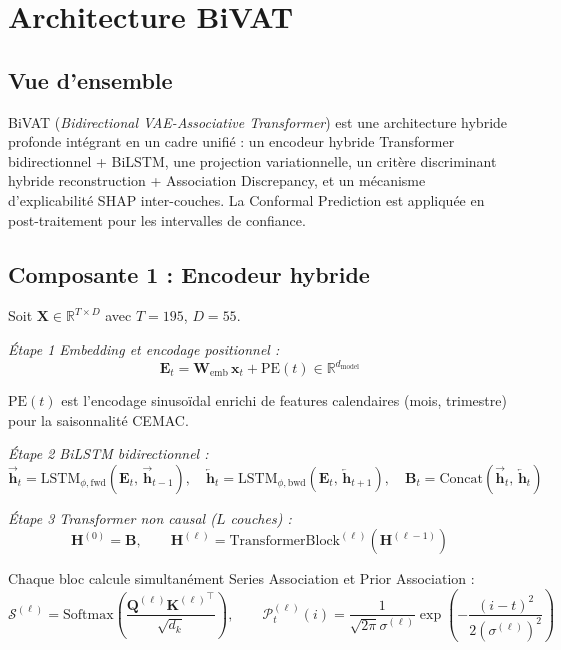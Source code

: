 \documentclass[12pt,a4paper]{article}
\begin{document}
\section{Architecture BiVAT}

\subsection{Vue d'ensemble}

BiVAT (\textit{Bidirectional VAE-Associative Transformer}) est une architecture
hybride profonde intégrant en un cadre unifié : un encodeur hybride Transformer
bidirectionnel + BiLSTM, une projection variationnelle, un critère discriminant
hybride reconstruction + Association Discrepancy, et un mécanisme d'explicabilité
SHAP inter-couches. La Conformal Prediction est appliquée en post-traitement
pour les intervalles de confiance.

\subsection{Composante 1 : Encodeur hybride}

Soit $\mathbf{X} \in \mathbb{R}^{T \times D}$ avec $T = 195$, $D = 55$.

\textit{Étape 1  Embedding et encodage positionnel :}
$$\mathbf{E}_t = \mathbf{W}_{\mathrm{emb}}\,\mathbf{x}_t + \mathrm{PE}(t)
\in \mathbb{R}^{d_{\mathrm{model}}}$$

$\mathrm{PE}(t)$ est l'encodage sinusoïdal enrichi de features calendaires
(mois, trimestre) pour la saisonnalité CEMAC.

\textit{Étape 2  BiLSTM bidirectionnel :}
$$\overrightarrow{\mathbf{h}}_t = \mathrm{LSTM}_{\phi,\mathrm{fwd}}(
\mathbf{E}_t,\,\overrightarrow{\mathbf{h}}_{t-1}), \quad
\overleftarrow{\mathbf{h}}_t = \mathrm{LSTM}_{\phi,\mathrm{bwd}}(
\mathbf{E}_t,\,\overleftarrow{\mathbf{h}}_{t+1}), \quad
\mathbf{B}_t = \mathrm{Concat}(\overrightarrow{\mathbf{h}}_t,\,
\overleftarrow{\mathbf{h}}_t)$$

\textit{Étape 3  Transformer non causal ($L$ couches) :}
$$\mathbf{H}^{(0)} = \mathbf{B}, \qquad
\mathbf{H}^{(\ell)} = \mathrm{TransformerBlock}^{(\ell)}(\mathbf{H}^{(\ell-1)})$$

Chaque bloc calcule simultanément Series Association et Prior Association :
$$\mathcal{S}^{(\ell)} = \mathrm{Softmax}\!\left(
\frac{\mathbf{Q}^{(\ell)}{\mathbf{K}^{(\ell)}}^\top}{\sqrt{d_k}}\right),
\qquad
\mathcal{P}^{(\ell)}_t(i) = \frac{1}{\sqrt{2\pi}\sigma^{(\ell)}}
\exp\!\left(-\frac{(i-t)^2}{2(\sigma^{(\ell)})^2}\right)$$
\end{document}
